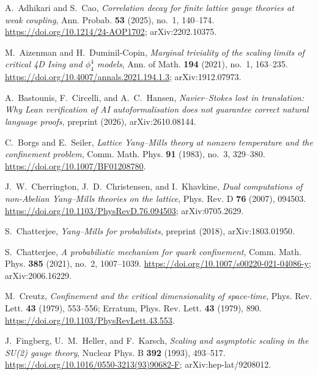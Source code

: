
A.~Adhikari and S.~Cao, \emph{Correlation decay for finite lattice gauge theories at weak coupling},
Ann. Probab. \textbf{53} (2025), no.~1, 140--174.
\url{https://doi.org/10.1214/24-AOP1702}; arXiv:2202.10375.

M.~Aizenman and H.~Duminil-Copin, \emph{Marginal triviality of the scaling limits of critical 4D Ising and $\phi_4^4$ models},
Ann. of Math. \textbf{194} (2021), no.~1, 163--235.
\url{https://doi.org/10.4007/annals.2021.194.1.3}; arXiv:1912.07973.

A.~Bastounis, F.~Circelli, and A.~C.~Hansen, \emph{Navier--Stokes lost in translation: Why Lean verification of AI autoformalisation does not guarantee correct natural language proofs},
preprint (2026), arXiv:2610.08144.

C.~Borgs and E.~Seiler, \emph{Lattice Yang--Mills theory at nonzero temperature and the confinement problem},
Comm. Math. Phys. \textbf{91} (1983), no.~3, 329--380.
\url{https://doi.org/10.1007/BF01208780}.

J.~W.~Cherrington, J.~D.~Christensen, and I.~Khavkine, \emph{Dual computations of non-Abelian Yang--Mills theories on the lattice},
Phys. Rev. D \textbf{76} (2007), 094503.
\url{https://doi.org/10.1103/PhysRevD.76.094503}; arXiv:0705.2629.

S.~Chatterjee, \emph{Yang--Mills for probabilists}, preprint (2018), arXiv:1803.01950.

S.~Chatterjee, \emph{A probabilistic mechanism for quark confinement},
Comm. Math. Phys. \textbf{385} (2021), no.~2, 1007--1039.
\url{https://doi.org/10.1007/s00220-021-04086-y}; arXiv:2006.16229.

M.~Creutz, \emph{Confinement and the critical dimensionality of space-time},
Phys. Rev. Lett. \textbf{43} (1979), 553--556; Erratum, Phys. Rev. Lett. \textbf{43} (1979), 890.
\url{https://doi.org/10.1103/PhysRevLett.43.553}.

J.~Fingberg, U.~M.~Heller, and F.~Karsch, \emph{Scaling and asymptotic scaling in the SU(2) gauge theory},
Nuclear Phys. B \textbf{392} (1993), 493--517.
\url{https://doi.org/10.1016/0550-3213(93)90682-F}; arXiv:hep-lat/9208012.

